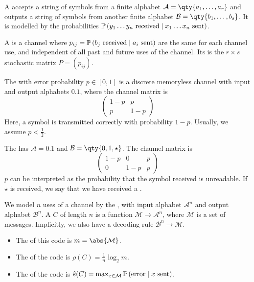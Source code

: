 \begin{definition}
    A  accepts a string of symbols from a finite alphabet $\mathcal A = \qty{a_1, \dots, a_r}$ and outputs a string of symbols from another finite alphabet $\mathcal B = \qty{b_1, \dots, b_s}$.
    It is modelled by the probabilities $\mathbb{P}\left({y_1 \dots y_n \text{ received} \mid x_1 \dots x_n \text{ sent}}\right)$.
\end{definition}
\begin{definition}
    A  is a channel where $p_{ij} = \mathbb{P}\left({b_j \text{ received} \mid a_i \text{ sent}}\right)$ are the same for each channel use, and independent of all past and future uses of the channel.
    Its  is the $r \times s$ stochastic matrix $P = (p_{ij})$.
\end{definition}
\begin{example}
    The  with error probability $p \in [0,1]$ is a discrete memoryless channel with input and output alphabets $\qty{0, 1}$, where the channel matrix is
    \[ \begin{pmatrix}
            1-p & p \\
            p & 1-p
    \end{pmatrix} \]
    Here, a symbol is transmitted correctly with probability $1 - p$.
    Usually, we assume $p < \frac{1}{2}$.
\end{example}
\begin{example}
    The  has $\mathcal A = \qty{0, 1}$ and $\mathcal B = \qty{0, 1, \star}$.
    The channel matrix is
    \[ \begin{pmatrix}
        1-p & 0 & p \\
        0 & 1-p & p
    \end{pmatrix} \]
    $p$ can be interpreted as the probability that the symbol received is unreadable.
    If $\star$ is received, we say that we have received a .
\end{example}
\begin{definition}
    We model $n$ uses of a channel by the , with input alphabet $\mathcal A^n$ and output alphabet $\mathcal B^n$.
    A  $C$ of length $n$ is a function $\mathcal M \to \mathcal A^n$, where $\mathcal M$ is a set of messages.
    Implicitly, we also have a decoding rule $\mathcal B^n \to \mathcal M$.
    \begin{itemize}
        \item The  of this code is $m = \abs{\mathcal M}$.
        \item The  of the code is $\rho(C) = \frac{1}{n} \log_2 m$.
        \item The  of the code is $\hat e(C) = \max_{x \in \mathcal M} \mathbb{P}\left({\text{error} \mid x \text{ sent}}\right)$.
    \end{itemize}
\end{definition}
